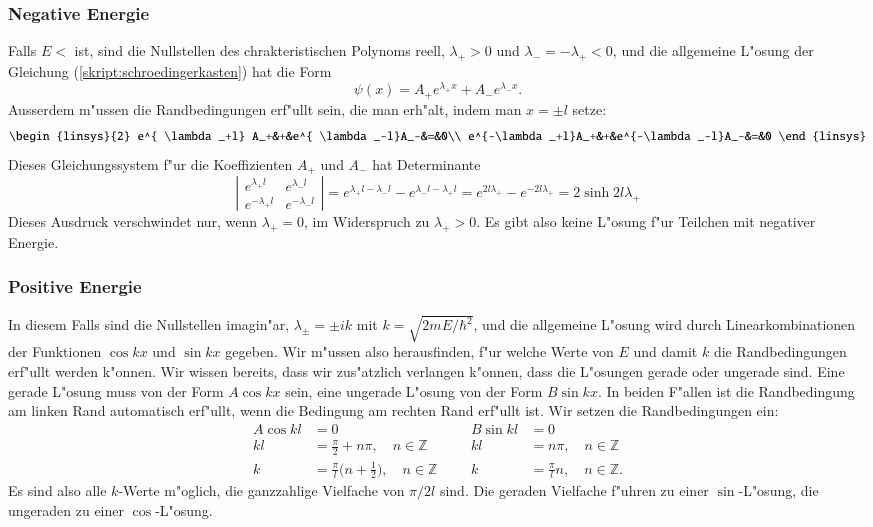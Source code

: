 \subsubsection{Negative Energie}
Falls $E<$ ist, sind die Nullstellen des chrakteristischen
Polynoms reell, $\lambda_+>0$ und $\lambda_-=-\lambda_+ < 0$,
und die allgemeine 
L"osung der Gleichung (\ref{skript:schroedingerkasten}) hat die Form
\[
\psi(x)=A_+e^{\lambda_+x}+A_-e^{\lambda_-x}.
\]
Ausserdem m"ussen die Randbedingungen erf"ullt sein, die man erh"alt,
indem man $x=\pm l$ setze:
\[
\begin{linsys}{2}
e^{ \lambda_+l} A_+&+&e^{ \lambda_-l}A_-&=&0\\
e^{-\lambda_+l}A_+&+&e^{-\lambda_-l}A_-&=&0
\end{linsys}
\]
Dieses Gleichungssystem f"ur die Koeffizienten $A_+$ und $A_-$ hat
Determinante
\[
\left|\begin{matrix}
e^{ \lambda_+l}&e^{ \lambda_-l}\\
e^{-\lambda_+l}&e^{-\lambda_-l}
\end{matrix}\right|
=
e^{\lambda_+l-\lambda_-l}-e^{\lambda_-l-\lambda_+l}
=
e^{2l\lambda_+}-e^{-2l\lambda_+}
=
2\sinh 2l\lambda_+
\]
Dieses Ausdruck verschwindet nur, wenn $\lambda_+=0$, im Widerspruch
zu $\lambda_+>0$.
Es gibt also keine L"osung f"ur Teilchen mit negativer Energie.

\subsubsection{Positive Energie}
In diesem Falls sind die Nullstellen imagin"ar, $\lambda_\pm=\pm ik$
mit $k=\sqrt{2mE/\hbar^2}$,
und die allgemeine L"osung wird durch Linearkombinationen der Funktionen
$\cos kx$ und $\sin kx$ gegeben.
Wir m"ussen also herausfinden, f"ur welche Werte von $E$ und damit $k$
die Randbedingungen erf"ullt werden k"onnen.
Wir wissen bereits, dass wir zus"atzlich verlangen k"onnen, dass die
L"osungen gerade oder ungerade sind.
Eine gerade L"osung muss von der Form $A\cos kx$ sein, eine ungerade
L"osung von der Form $B\sin kx$.
In beiden F"allen ist die Randbedingung am linken Rand automatisch
erf"ullt, wenn die Bedingung am rechten Rand erf"ullt ist.
Wir setzen die Randbedingungen ein:
\begin{align*}
A\cos kl&=0
	&&&
		B\sin kl&=0\\
kl&=\frac{\pi}2+n\pi,\quad n\in\mathbb Z
	&&&
		kl&=n\pi,\quad n\in\mathbb Z\\
k&=\frac{\pi}{l}\biggl(n+\frac12\biggr),\quad n\in\mathbb Z
	&&&
		k&=\frac{\pi}{l}n,\quad n\in\mathbb Z.
\end{align*}
Es sind also alle $k$-Werte m"oglich, die ganzzahlige Vielfache von
$\pi/2l$ sind.
Die geraden Vielfache f"uhren zu einer $\sin$-L"osung, die ungeraden
zu einer $\cos$-L"osung.

